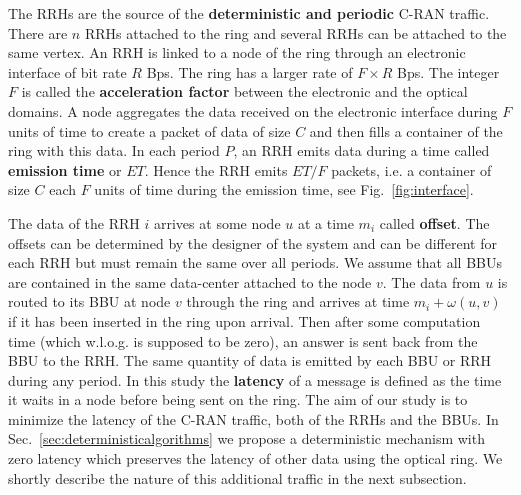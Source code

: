 \documentclass[]{llncs}
\begin{document}
   The RRHs are the source of the {\bf deterministic and periodic} C-RAN traffic.
   There are $n$ RRHs attached to the ring and several RRHs can be attached to the same vertex. An RRH is linked to a node of the ring through an electronic interface of bit rate $R$ Bps.
   The ring has a larger rate of $F\times R$ Bps. The integer $F$ is called the {\bf acceleration factor} between the electronic and the optical domains. A node aggregates the data received on the electronic interface during $F$ units of time to create a packet of data of size $C$ and then fills a container of the ring with this data. 
  In each period $P$, an RRH emits data during a time called \textbf{emission time} or $ET$. Hence the RRH emits $ET / F$ packets, i.e. a container of size $C$ each $F$ units of time during the emission time, see Fig.~\ref{fig:interface}.
   
   The data of the RRH $i$ arrives at some node $u$ at a time $m_i$ called {\bf offset}. The offsets can be determined 
   by the designer of the system and can be different for each RRH but must remain the same over all periods. We assume that all BBUs are contained in the same data-center attached to the node $v$. The data from $u$ is routed to its BBU at node $v$ through the ring and arrives at time $m_i + \omega(u,v)$ if it has been inserted in the ring upon arrival. Then after some computation time (which w.l.o.g. is supposed to be zero), an answer is sent back from the BBU to the RRH. The same quantity of data is emitted by each BBU or RRH during any period.
   In this study the {\bf latency} of a message is defined as the time it waits in a node before being sent on the ring.
   The aim of our study is to minimize the latency of the C-RAN traffic, both of the RRHs and the BBUs. 
   In Sec.~\ref{sec:deterministicalgorithms} we propose a deterministic mechanism with zero latency which preserves the latency of other data using the optical ring. We shortly describe the nature of this additional traffic in the next subsection.
   
\end{document}
